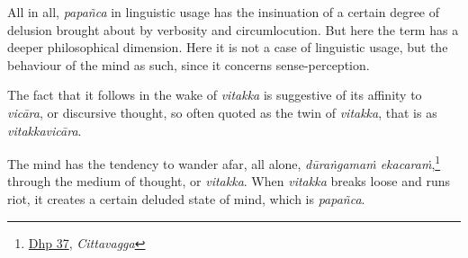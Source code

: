 All in all, \emph{papañca} in linguistic usage has the insinuation of a certain degree of delusion brought about by verbosity and circumlocution. But here the term has a deeper philosophical dimension. Here it is not a case of linguistic usage, but the behaviour of the mind as such, since it concerns sense-perception.

The fact that it follows in the wake of \emph{vitakka} is suggestive of its affinity to \emph{vicāra}, or discursive thought, so often quoted as the twin of \emph{vitakka}, that is as \emph{vitakkavicāra}.

The mind has the tendency to wander afar, all alone, \emph{dūraṅgamaṁ ekacaraṁ},\footnote{\href{https://suttacentral.net/dhp33-43/pli/ms}{Dhp 37}, \emph{Cittavagga}} through the medium of thought, or \emph{vitakka}. When \emph{vitakka} breaks loose and runs riot, it creates a certain deluded state of mind, which is \emph{papañca}.
